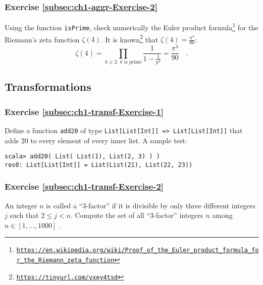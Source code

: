 \subsubsection{Exercise \label{subsec:ch1-aggr-Exercise-2}\ref{subsec:ch1-aggr-Exercise-2}}

Using the function \lstinline!isPrime!, check numerically the Euler
product formula\footnote{\texttt{\href{https://en.wikipedia.org/wiki/Proof_of_the_Euler_product_formula_for_the_Riemann_zeta_function}{https://en.wikipedia.org/wiki/Proof\_of\_the\_Euler\_product\_formula\_for\_the\_Riemann\_zeta\_function}}}
for the Riemann\textsf{'}s zeta function $\zeta\left(4\right)$.
It is known\footnote{\texttt{\href{https://ocw.mit.edu/courses/mathematics/18-104-seminar-in-analysis-applications-to-number-theory-fall-2006/projects/chan.pdf}{https://tinyurl.com/yxey4tsd}}}
that $\zeta\left(4\right)=\frac{\pi^{4}}{90}$:
\[
\zeta\left(4\right)=\prod_{k\geq2;~k\text{ is prime}}\frac{1}{1-\frac{1}{p^{4}}}=\frac{\pi^{4}}{90}\quad.
\]


\subsection{Transformations}

\subsubsection{Exercise \label{subsec:ch1-transf-Exercise-1}\ref{subsec:ch1-transf-Exercise-1}}

Define a function \texttt{}\lstinline!add20! of type \texttt{}\lstinline!List[List[Int]] => List[List[Int]]!
that adds $20$ to every element of every inner list. A sample test:
\begin{lstlisting}
scala> add20( List( List(1), List(2, 3) ) )
res0: List[List[Int]] = List(List(21), List(22, 23))
\end{lstlisting}


\subsubsection{Exercise \label{subsec:ch1-transf-Exercise-2}\ref{subsec:ch1-transf-Exercise-2}}

An integer $n$ is called a \textsf{``}$3$-factor\textsf{''} if it is divisible by
only three different integers $j$ such that $2\leq j<n$. Compute
the set of all \textsf{``}$3$-factor\textsf{''} integers $n$ among $n\in[1,...,1000]$
.

